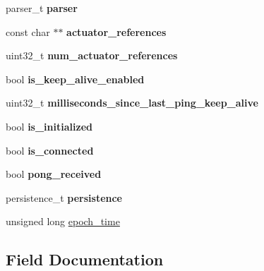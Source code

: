\begin{DoxyCompactItemize}
\item 
\mbox{\label{struct__wolk__ctx__t_a75482b6b5f654f444aecd3ce133bcc8a}} 
parser\+\_\+t {\bfseries parser}
\item 
\mbox{\label{struct__wolk__ctx__t_a87d5e3b33fed53ef02c61111860fe929}} 
const char $\ast$$\ast$ {\bfseries actuator\+\_\+references}
\item 
\mbox{\label{struct__wolk__ctx__t_a3a96676f3cede3bd6f6e31d9cee30443}} 
uint32\+\_\+t {\bfseries num\+\_\+actuator\+\_\+references}
\item 
\mbox{\label{struct__wolk__ctx__t_a020de31835a1a0105cf149f2c66c4a1d}} 
bool {\bfseries is\+\_\+keep\+\_\+alive\+\_\+enabled}
\item 
\mbox{\label{struct__wolk__ctx__t_a1aa9fb2f10f0a9f2d7ca66734a28cd42}} 
uint32\+\_\+t {\bfseries milliseconds\+\_\+since\+\_\+last\+\_\+ping\+\_\+keep\+\_\+alive}
\item 
\mbox{\label{struct__wolk__ctx__t_a65aec58259024398da781689ad05799a}} 
bool {\bfseries is\+\_\+initialized}
\item 
\mbox{\label{struct__wolk__ctx__t_abeedd5d0c334aab47fd6aac270b8d1e0}} 
bool {\bfseries is\+\_\+connected}
\item 
\mbox{\label{struct__wolk__ctx__t_a756475fe4cd97ed31ae3e665692c3f48}} 
bool {\bfseries pong\+\_\+received}
\item 
\mbox{\label{struct__wolk__ctx__t_acedc150706ec304c5045f9c77b065ccd}} 
persistence\+\_\+t {\bfseries persistence}
\item 
unsigned long \hyperlink{struct__wolk__ctx__t_a0c63c52881404b0305e8b4dba0b0b6a6}{epoch\+\_\+time}
\end{DoxyCompactItemize}


\subsection{Field Documentation}
\mbox{\label{struct__wolk__ctx__t_ac55ed80718abb1dca3027edda713ca57}} 
